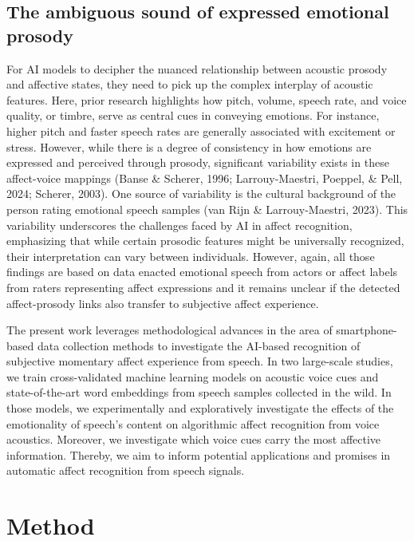 \documentclass[
  english,
  man,floatsintext]{apa6}
\begin{document}
\hypertarget{the-ambiguous-sound-of-expressed-emotional-prosody}{%
\subsection{The ambiguous sound of expressed emotional prosody}\label{the-ambiguous-sound-of-expressed-emotional-prosody}}

For AI models to decipher the nuanced relationship between acoustic prosody and affective states, they need to pick up the complex interplay of acoustic features. Here, prior research highlights how pitch, volume, speech rate, and voice quality, or timbre, serve as central cues in conveying emotions. For instance, higher pitch and faster speech rates are generally associated with excitement or stress. However, while there is a degree of consistency in how emotions are expressed and perceived through prosody, significant variability exists in these affect-voice mappings (Banse \& Scherer, 1996; Larrouy-Maestri, Poeppel, \& Pell, 2024; Scherer, 2003). One source of variability is the cultural background of the person rating emotional speech samples (van Rijn \& Larrouy-Maestri, 2023). This variability underscores the challenges faced by AI in affect recognition, emphasizing that while certain prosodic features might be universally recognized, their interpretation can vary between individuals. However, again, all those findings are based on data enacted emotional speech from actors or affect labels from raters representing affect expressions and it remains unclear if the detected affect-prosody links also transfer to subjective affect experience.

The present work leverages methodological advances in the area of smartphone-based data collection methods to investigate the AI-based recognition of subjective momentary affect experience from speech. In two large-scale studies, we train cross-validated machine learning models on acoustic voice cues and state-of-the-art word embeddings from speech samples collected in the wild. In those models, we experimentally and exploratively investigate the effects of the emotionality of speech's content on algorithmic affect recognition from voice acoustics. Moreover, we investigate which voice cues carry the most affective information. Thereby, we aim to inform potential applications and promises in automatic affect recognition from speech signals.

\hypertarget{method}{%
\section{Method}\label{method}}
\end{document}
